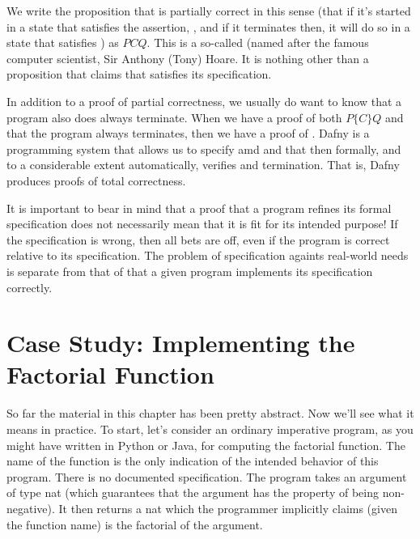 \documentclass[letterpaper,10pt,english]{sphinxmanual}
\begin{document}
We write the proposition that  is partially correct in this sense
(that if it’s started in a state that satisfies the assertion, ,
and if it terminates then, it will do so in a state that satisfies
) as \(P {C} Q.\) This is a so-called  (named
after the famous computer scientist, Sir Anthony (Tony) Hoare. It is
nothing other than a proposition that claims that  satisfies its
specification.

In addition to a proof of partial correctness, we usually do want to
know that a program also does always terminate. When we have a proof
of both \(P \{C\} Q\) and that the program always terminates, then
we have a proof of . Dafny is a programming system
that allows us to specify  amd  and that then formally, and to a
considerable extent automatically, verifies  and termination.
That is, Dafny produces proofs of total correctness.

It is important to bear in mind that a proof that a program refines
its formal specification does not necessarily mean that it is fit for
its intended purpose! If the specification is wrong, then all bets are
off, even if the program is correct relative to its specification.
The problem of  specification againts real-world needs is
separate from that of  that a given program implements its
specification correctly.


\section{Case Study: Implementing the Factorial Function}
\label{\detokenize{05-putting-it-together:case-study-implementing-the-factorial-function}}
So far the material in this chapter has been pretty abstract. Now
we’ll see what it means in practice. To start, let’s consider an
ordinary imperative program, as you might have written in Python or
Java, for computing the factorial function. The name of the function
is the only indication of the intended behavior of this program. There
is no documented specification. The program takes an argument of type
nat (which guarantees that the argument has the property of being
non-negative). It then returns a nat which the programmer implicitly
claims (given the function name) is the factorial of the argument.
\end{document}
